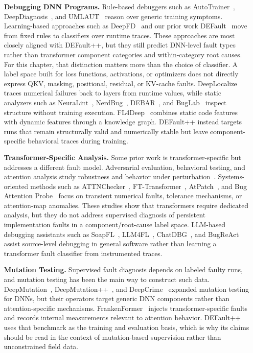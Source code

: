 \textbf{Debugging DNN Programs.}
Rule-based debuggers such as AutoTrainer~\cite{autotrainer}, DeepDiagnosis~\cite{deepdiagnosis}, and UMLAUT~\cite{umlaut} reason over generic training symptoms. Learning-based approaches such as DeepFD~\cite{deepfd} and our prior work DEFault~\cite{default} move from fixed rules to classifiers over runtime traces. These approaches are most closely aligned with DEFault++, but they still predict DNN-level fault types rather than transformer component categories and within-category root causes. For this chapter, that distinction matters more than the choice of classifier. A label space built for loss functions, activations, or optimizers does not directly express QKV, masking, positional, residual, or KV-cache faults. DeepLocalize~\cite{deeplocalize} traces numerical failures back to layers from runtime values, while static analyzers such as NeuraLint~\cite{NeuraLint}, NerdBug~\cite{nerdbug}, DEBAR~\cite{debar}, and BugLab~\cite{buglab} inspect structure without training execution. FL4Deep~\cite{fl4deep} combines static code features with dynamic features through a knowledge graph. DEFault++ instead targets runs that remain structurally valid and numerically stable but leave component-specific behavioral traces during training.

\textbf{Transformer-Specific Analysis.}
Some prior work is transformer-specific but addresses a different fault model. Adversarial evaluation, behavioral testing, and attention analysis study robustness and behavior under perturbation~\cite{jones2020adversarial,ribeiro2020checklist,clark2019does,voita2019analyzing}. Systems-oriented methods such as ATTNChecker~\cite{liang2025attnchecker}, FT-Transformer~\cite{fttransformer}, AtPatch~\cite{atpatch2026}, and Bug Attention Probe~\cite{bap2025} focus on transient numerical faults, tolerance mechanisms, or attention-map anomalies. These studies show that transformers require dedicated analysis, but they do not address supervised diagnosis of persistent implementation faults in a component/root-cause label space. LLM-based debugging assistants such as SoapFL~\cite{soapfl2025}, LLM4FL~\cite{llm4fl2024}, ChatDBG~\cite{chatdbg2025}, and BugReAct~\cite{bugreact2026} assist source-level debugging in general software rather than learning a transformer fault classifier from instrumented traces.

\textbf{Mutation Testing.}
Supervised fault diagnosis depends on labeled faulty runs, and mutation testing has been the main way to construct such data. DeepMutation~\cite{deepmutation}, DeepMutation++~\cite{deepmutation++}, and DeepCrime~\cite{deepcrime} expanded mutation testing for DNNs, but their operators target generic DNN components rather than attention-specific mechanisms. FrankenFormer~\cite{frankenformer} injects transformer-specific faults and records internal measurements relevant to attention behavior. DEFault++ uses that benchmark as the training and evaluation basis, which is why its claims should be read in the context of mutation-based supervision rather than unconstrained field data.

